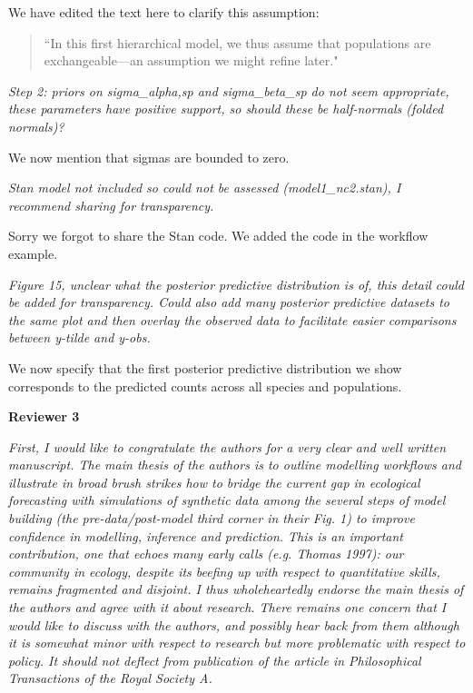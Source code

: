 \documentclass[11pt,letter]{article}
\begin{document}
We have edited the text here to clarify this assumption:
\begin{quote}
``In this first hierarchical model, we thus assume that populations are exchangeable---an assumption we might refine later."
\end{quote}


\begin{mybox}
\emph{Step 2: priors on sigma\_alpha,sp and sigma\_beta\_sp do not seem
appropriate, these parameters have positive support, so should these be
half-normals (folded normals)?}
\end{mybox}

We now mention that sigmas are bounded to zero.

\begin{mybox}
\emph{Stan model not included so could not be assessed (model1\_nc2.stan), I
recommend sharing for transparency.}
\end{mybox}

Sorry we forgot to share the Stan code. We added the code in the workflow example.

\begin{mybox}
\emph{Figure 15, unclear what the posterior predictive distribution is of,
this detail could be added for transparency. Could also add many
posterior predictive datasets to the same plot and then overlay the
observed data to facilitate easier comparisons between y-tilde and y-obs.}
\end{mybox}

We now specify that the first posterior predictive distribution we show corresponds to the predicted counts across all species and populations.

{\bf Reviewer 3}

\begin{mybox}
\emph{First, I would like to congratulate the authors for a very clear and well written manuscript. The main thesis of the authors is to outline modelling workflows and illustrate in broad brush strikes how to bridge the current gap in ecological forecasting with simulations of synthetic data among the several steps of model building (the pre-data/post-model third corner in their Fig. 1) to improve confidence in modelling, inference and prediction. This is an important contribution, one that echoes many early calls (e.g. Thomas 1997): our community in ecology, despite its beefing up with respect to quantitative skills, remains fragmented and disjoint. I thus wholeheartedly endorse the main thesis of the authors and agree with it about research. There remains one concern that I would like to discuss with the authors, and possibly hear back from them although it is somewhat minor with respect to research but more problematic with respect to policy. It should not deflect from publication of the article in Philosophical Transactions of the Royal Society A.}
\end{mybox}
\end{document}
